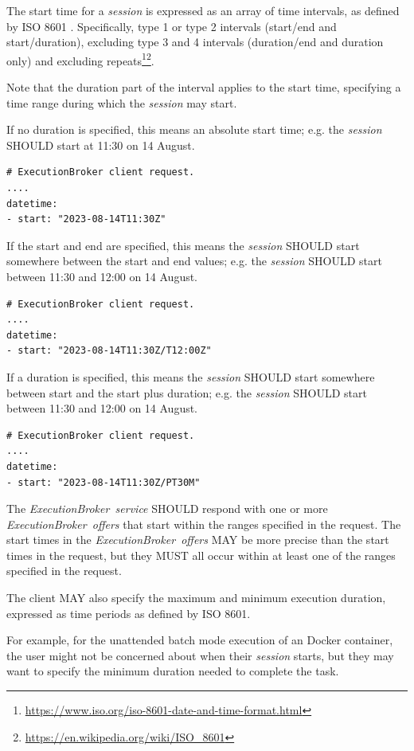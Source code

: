 \documentclass[11pt,a4paper]{ivoa}
\newcommand{\execbrokerservice}[1] {\textit{ExecutionBroker~service#1}}
\newcommand{\execoffer}[1] {\textit{ExecutionBroker~offer#1}}
\newcommand{\workerjob}[1] {\textit{session#1}}
\newcommand{\dockercontainer} {Docker container}
\newcommand{\footurl}[1] {\footnote{\url{#1}}}
\begin{document}
The start time for a \workerjob{} is expressed as an array of time intervals, as defined by
ISO 8601 \citep{std:iso8601}.
Specifically, type 1 or type 2 intervals (start/end and start/duration), excluding type 3 and 4 intervals
(duration/end and duration only) and excluding
repeats\footurl{https://www.iso.org/iso-8601-date-and-time-format.html}\footurl{https://en.wikipedia.org/wiki/ISO_8601}.

Note that the duration part of the interval applies to the start time, specifying a
time range during which the \workerjob{} may start.

If no duration is specified, this means an absolute start time;
e.g. the \workerjob{} SHOULD start at 11:30 on 14 August.
\begin{lstlisting}[]
# ExecutionBroker client request.
....
datetime:
- start: "2023-08-14T11:30Z"
\end{lstlisting}

If the start and end are specified, this means the \workerjob{} SHOULD start somewhere between
the start and end values;
e.g. the \workerjob{} SHOULD start between 11:30 and 12:00 on 14 August.
\begin{lstlisting}[]
# ExecutionBroker client request.
....
datetime:
- start: "2023-08-14T11:30Z/T12:00Z"
\end{lstlisting}

If a duration is specified, this means the \workerjob{} SHOULD start somewhere between
start and the start plus duration;
e.g. the \workerjob{} SHOULD start between 11:30 and 12:00 on 14 August.
\begin{lstlisting}[]
# ExecutionBroker client request.
....
datetime:
- start: "2023-08-14T11:30Z/PT30M"
\end{lstlisting}

The \execbrokerservice{} SHOULD respond with one or more \execoffer{s} that start within
the ranges specified in the request.
The start times in the \execoffer{s} MAY be more precise than the start times in the request,
but they MUST all occur within at least one of the ranges specified in the request.

The client MAY also specify the maximum and minimum execution duration,
expressed as time periods as defined by ISO 8601.

For example, for the unattended batch mode execution of an \dockercontainer, the user might not be concerned about
when their \workerjob{} starts, but they may want to specify the minimum duration needed to complete the task.
\end{document}
